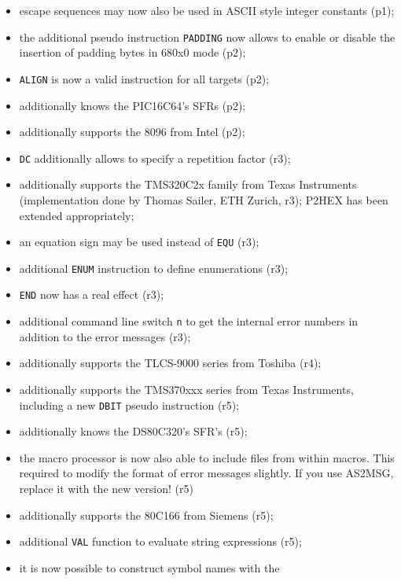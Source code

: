 \documentclass[12pt,twoside]{report}
\newcommand{\tty}[1]{{\tt #1}}
\begin{document}
\begin{itemize}
{\begin{itemize}
{            line numbering in the assembly listing (p1);}
      \item{escape sequences may now also be used in ASCII style
            integer constants (p1);}
      \item{the additional pseudo instruction \tty{PADDING} now allows
            to enable or disable the insertion of padding bytes
            in 680x0 mode (p2);}
      \item{\tty{ALIGN} is now a valid instruction for all targets
            (p2);}
      \item{additionally knows the PIC16C64's SFRs (p2);}
      \item{additionally supports the 8096 from Intel (p2);}
      \item{\tty{DC} additionally allows to specify a repetition factor
            (r3);}
      \item{additionally supports the TMS320C2x family from Texas
            Instruments (implementation done by Thomas Sailer, ETH
            Zurich, r3); P2HEX has been extended appropriately;}
      \item{an equation sign may be used instead of \tty{EQU} (r3);}
      \item{additional \tty{ENUM} instruction to define enumerations
            (r3);}
      \item{\tty{END} now has a real effect (r3);}
      \item{additional command line switch \tty{n} to get the internal
            error numbers in addition to the error messages (r3);}
      \item{additionally supports the TLCS-9000 series from
            Toshiba (r4);}
      \item{additionally supports the TMS370xxx series from Texas
            Instruments, including a new \tty{DBIT} pseudo instruction
            (r5);}
      \item{additionally knows the DS80C320's SFR's (r5);}
      \item{the macro processor is now also able to include files
            from within macros.  This required to modify the
            format of error messages slightly.  If you use
            AS2MSG, replace it with the new version! (r5)}
      \item{additionally supports the 80C166 from Siemens (r5);}
      \item{additional \tty{VAL} function to evaluate string
            expressions (r5);}
      \item{it is now possible to construct symbol names with the
}
\end{itemize}}
\end{itemize}
\end{document}
